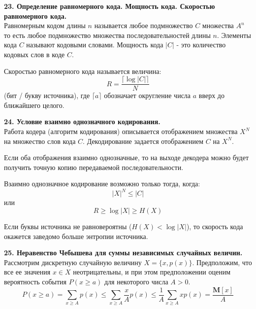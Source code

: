 \documentclass[14pt]{article}
\begin{document}
\bigskip
\textbf{23. Определение равномерного кода. Мощность кода. Скоростью равномерного кода.} \\

Равномерным кодом длины \(n\) называется любое подмножество \(C\) множества \(A^n\) то есть любое подмножество множества последовательностей длины \(n\). Элементы кода \(C\) называют кодовыми словами. Мощность кода \(|C|\) - это количество кодовых слов в коде \(C\).

Скоростью равномерного кода называется величина: \\
\begin{displaymath}
    R = \frac{\lceil \log |C| \rceil}{N}
\end{displaymath}
(бит / букву источника), где \(\lceil a \rceil\) обозначает округление числа \(a\) вверх до ближайшего целого.

\bigskip
\textbf{24. Условие взаимно однозначного кодирования.} \\

Работа кодера (алгоритм кодирования) описывается отображением множества \(X^N\) на множество слов кода \(C\). Декодирование задается отображением \(C\) на \(X^N\).

Если оба отображения взаимно однозначные, то на выходе декодера можно будет получить точную копию передаваемой последовательности.

Взаимно однозначное кодирование возможно только тогда, когда: \\
\begin{displaymath}
    |X|^N \leq |C|
\end{displaymath}
или
\begin{displaymath}
    R \geq \log |X| \geq H(X)
\end{displaymath}

Если буквы источника не равновероятны (\(H(X) < \log |X|\)), то скорость кода окажется заведомо больше энтропии источника.

\bigskip
\textbf{25. Неравенство Чебышева для суммы независимых случайных величин.} \\

Рассмотрим дискретную случайную величину \(X = \{x, p(x)\}\). Предположим, что все ее значения \(x \in X\) неотрицательны, и при этом предположении оценим вероятность события \(P(x \geq a)\) для некоторого числа \(A > 0\).
\begin{displaymath}
    P(x \geq a) = \sum_{x \geq A} p(x) \leq \sum_{x \geq A} \frac{x}{A}p(x) \leq \frac{1}{A}\sum_{x \geq A} xp(x) = \frac{\textbf{M}[x]}{A}
\end{displaymath}
\end{document}
